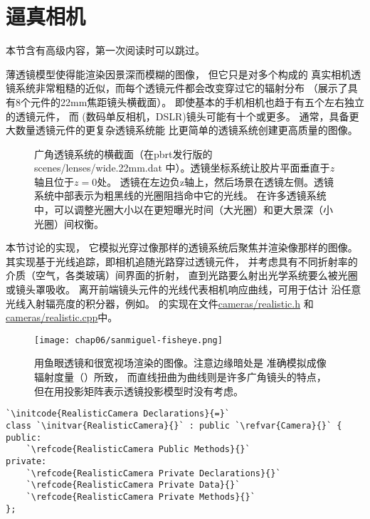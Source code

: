 \section{逼真相机}\label{sec:逼真相机}
\begin{remark}
    本节含有高级内容，第一次阅读时可以跳过。
\end{remark}

薄透镜模型使得能渲染因景深而模糊的图像，
但它只是对多个构成的
真实相机透镜系统非常粗糙的近似，而每个透镜元件都会改变穿过它的辐射分布
（展示了具有8个元件的22mm焦距镜头横截面）。
即使基本的手机相机也趋于有五个左右独立的透镜元件，
而
(数码单反相机，DSLR)镜头可能有十个或更多。
通常，具备更大数量透镜元件的更复杂透镜系统能
比更简单的透镜系统创建更高质量的图像。
\begin{figure}[htbp]
    \centering
    \caption{广角透镜系统的横截面（在pbrt发行版的{\ttfamily scenes/lenses/wide.22mm.dat}
    中）。透镜坐标系统让胶片平面垂直于$z$轴且位于$z=0$处。
    透镜在左边负z轴上，然后场景在透镜左侧。透镜系统中部表示为粗黑线的光圈阻挡命中它的光线。
    在许多透镜系统中，可以调整光圈大小以在更短曝光时间（大光圈）和更大景深（小光圈）间权衡。}
    \label{fig:6.15}
\end{figure}

本节讨论的实现，
它模拟光穿过像那样的透镜系统后聚焦并渲染像那样的图像。
其实现基于光线追踪，即相机追随光路穿过透镜元件，
并考虑具有不同折射率的介质（空气，各类玻璃）间界面的折射，
直到光路要么射出光学系统要么被光圈或镜头罩吸收。
离开前端镜头元件的光线代表相机响应曲线，可用于估计
沿任意光线入射辐亮度的积分器，例如。
的实现在文件\href{https://github.com/mmp/pbrt-v3/tree/master/src/cameras/realistic.h}{\ttfamily cameras/realistic.h}
和\href{https://github.com/mmp/pbrt-v3/tree/master/src/cameras/realistic.cpp}{\ttfamily cameras/realistic.cpp}中。
\begin{figure}[htbp]
    \centering\texttt{[image: chap06/sanmiguel-fisheye.png]}
    \caption{用鱼眼透镜和很宽视场渲染的图像。注意边缘暗处是
        准确模拟成像辐射度量（）所致，
        而直线扭曲为曲线则是许多广角镜头的特点，但在用投影矩阵表示透镜投影模型时没有考虑。}
    \label{fig:6.16}
\end{figure}
\begin{lstlisting}
`\initcode{RealisticCamera Declarations}{=}`
class `\initvar{RealisticCamera}{}` : public `\refvar{Camera}{}` {
public:
    `\refcode{RealisticCamera Public Methods}{}`
private:
    `\refcode{RealisticCamera Private Declarations}{}`
    `\refcode{RealisticCamera Private Data}{}`
    `\refcode{RealisticCamera Private Methods}{}`
};
\end{lstlisting}

